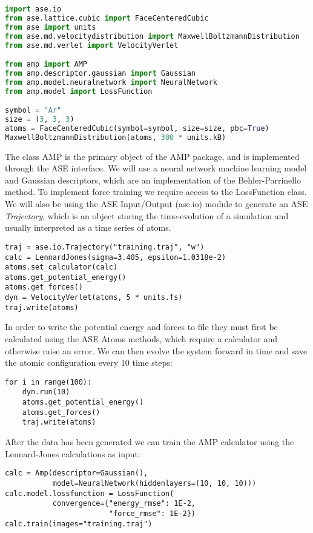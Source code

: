 \begin{lstlisting}[language=python,basicstyle=\small]
import ase.io
from ase.lattice.cubic import FaceCenteredCubic
from ase import units
from ase.md.velocitydistribution import MaxwellBoltzmannDistribution
from ase.md.verlet import VelocityVerlet

from amp import AMP
from amp.descriptor.gaussian import Gaussian
from amp.model.neuralnetwork import NeuralNetwork
from amp.model import LossFunction

symbol = "Ar"
size = (3, 3, 3)
atoms = FaceCenteredCubic(symbol=symbol, size=size, pbc=True)
MaxwellBoltzmannDistribution(atoms, 300 * units.kB)
\end{lstlisting}

The class AMP is the primary object of the AMP package,
and is implemented through the ASE interface.
We will use a neural network machine learning model
and Gaussian descriptors, which are an implementation of the
Behler-Parrinello method. To implement force training we require
access to the LossFunction class.
We will also be using the ASE Input/Output (ase.io) module to generate an
ASE \textit{Trajectory}, which is an object
storing the time-evolution of a simulation and usually interpreted
as a time series of atoms.

\begin{lstlisting}
traj = ase.io.Trajectory("training.traj", "w")
calc = LennardJones(sigma=3.405, epsilon=1.0318e-2)
atoms.set_calculator(calc)
atoms.get_potential_energy()
atoms.get_forces()
dyn = VelocityVerlet(atoms, 5 * units.fs)
traj.write(atoms)
\end{lstlisting}

In order to write the potential energy and forces to file
they must first be calculated using the ASE Atoms methods,
which require a calculator and otherwise raise an error.
We can then evolve the system forward in time
and save the atomic configuration every 10 time steps:

\begin{lstlisting}
for i in range(100):
    dyn.run(10)
    atoms.get_potential_energy()
    atoms.get_forces()
    traj.write(atoms)
\end{lstlisting}

After the data has been generated we can train the AMP calculator
using the Lennard-Jones calculations as input:

\begin{lstlisting}
calc = Amp(descriptor=Gaussian(),
           model=NeuralNetwork(hiddenlayers=(10, 10, 10)))
calc.model.lossfunction = LossFunction(
           convergence={"energy_rmse": 1E-2,
                        "force_rmse": 1E-2})
calc.train(images="training.traj")
\end{lstlisting}

